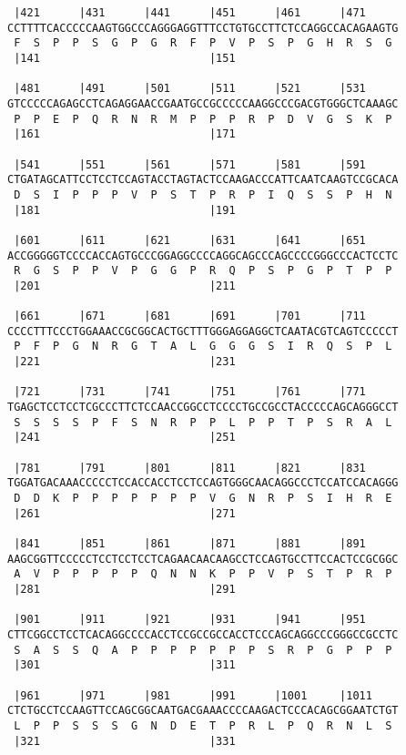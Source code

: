 \documentclass{article}
\begin{document}
\begin{Verbatim}
 |421      |431      |441      |451      |461      |471     
CCTTTTCACCCCCAAGTGGCCCAGGGAGGTTTCCTGTGCCTTCTCCAGGCCACAGAAGTG
 F  S  P  P  S  G  P  G  R  F  P  V  P  S  P  G  H  R  S  G 
 |141                          |151                         
  
 |481      |491      |501      |511      |521      |531     
GTCCCCCAGAGCCTCAGAGGAACCGAATGCCGCCCCCAAGGCCCGACGTGGGCTCAAAGC
 P  P  E  P  Q  R  N  R  M  P  P  P  R  P  D  V  G  S  K  P 
 |161                          |171                         
  
 |541      |551      |561      |571      |581      |591     
CTGATAGCATTCCTCCTCCAGTACCTAGTACTCCAAGACCCATTCAATCAAGTCCGCACA
 D  S  I  P  P  P  V  P  S  T  P  R  P  I  Q  S  S  P  H  N 
 |181                          |191                         
  
 |601      |611      |621      |631      |641      |651     
ACCGGGGGTCCCCACCAGTGCCCGGAGGCCCCAGGCAGCCCAGCCCCGGGCCCACTCCTC
 R  G  S  P  P  V  P  G  G  P  R  Q  P  S  P  G  P  T  P  P 
 |201                          |211                         
  
 |661      |671      |681      |691      |701      |711     
CCCCTTTCCCTGGAAACCGCGGCACTGCTTTGGGAGGAGGCTCAATACGTCAGTCCCCCT
 P  F  P  G  N  R  G  T  A  L  G  G  G  S  I  R  Q  S  P  L 
 |221                          |231                         
  
 |721      |731      |741      |751      |761      |771     
TGAGCTCCTCCTCGCCCTTCTCCAACCGGCCTCCCCTGCCGCCTACCCCCAGCAGGGCCT
 S  S  S  S  P  F  S  N  R  P  P  L  P  P  T  P  S  R  A  L 
 |241                          |251                         
  
 |781      |791      |801      |811      |821      |831     
TGGATGACAAACCCCCTCCACCACCTCCTCCAGTGGGCAACAGGCCCTCCATCCACAGGG
 D  D  K  P  P  P  P  P  P  P  V  G  N  R  P  S  I  H  R  E 
 |261                          |271                         
  
 |841      |851      |861      |871      |881      |891     
AAGCGGTTCCCCCTCCTCCTCCTCAGAACAACAAGCCTCCAGTGCCTTCCACTCCGCGGC
 A  V  P  P  P  P  P  Q  N  N  K  P  P  V  P  S  T  P  R  P 
 |281                          |291                         
  
 |901      |911      |921      |931      |941      |951     
CTTCGGCCTCCTCACAGGCCCCACCTCCGCCGCCACCTCCCAGCAGGCCCGGGCCGCCTC
 S  A  S  S  Q  A  P  P  P  P  P  P  P  S  R  P  G  P  P  P 
 |301                          |311                         
  
 |961      |971      |981      |991      |1001     |1011    
CTCTGCCTCCAAGTTCCAGCGGCAATGACGAAACCCCAAGACTCCCACAGCGGAATCTGT
 L  P  P  S  S  S  G  N  D  E  T  P  R  L  P  Q  R  N  L  S 
 |321                          |331                         
  

\end{Verbatim}
\end{document}
